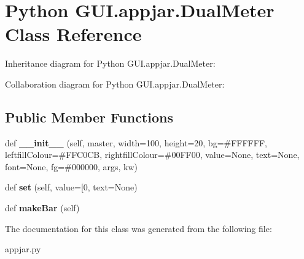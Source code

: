 \hypertarget{class_python_01_g_u_i_1_1appjar_1_1_dual_meter}{}\section{Python G\+U\+I.\+appjar.\+Dual\+Meter Class Reference}
\label{class_python_01_g_u_i_1_1appjar_1_1_dual_meter}


Inheritance diagram for Python G\+U\+I.\+appjar.\+Dual\+Meter\+:


Collaboration diagram for Python G\+U\+I.\+appjar.\+Dual\+Meter\+:
\subsection*{Public Member Functions}
\begin{DoxyCompactItemize}
\item 
\mbox{\label{class_python_01_g_u_i_1_1appjar_1_1_dual_meter_ada021988bd3aba1d00e0e6405a5c48a1}} 
def {\bfseries \+\_\+\+\_\+init\+\_\+\+\_\+} (self, master, width=100, height=20, bg=\textquotesingle{}\#F\+F\+F\+F\+FF\textquotesingle{}, leftfill\+Colour=\textquotesingle{}\#F\+F\+C0\+CB\textquotesingle{}, rightfill\+Colour=\textquotesingle{}\#00\+F\+F00\textquotesingle{}, value=\+None, text=\+None, font=\+None, fg=\textquotesingle{}\#000000\textquotesingle{}, args, kw)
\item 
\mbox{\label{class_python_01_g_u_i_1_1appjar_1_1_dual_meter_a3077274ba5fc45e1d73b78b082c236c6}} 
def {\bfseries set} (self, value=\mbox{[}0, text=None)
\item 
\mbox{\label{class_python_01_g_u_i_1_1appjar_1_1_dual_meter_a990a4e62c958c90509a6e65e0ac25061}} 
def {\bfseries make\+Bar} (self)
\end{DoxyCompactItemize}


The documentation for this class was generated from the following file\+:\begin{DoxyCompactItemize}
\item 
appjar.\+py\end{DoxyCompactItemize}
